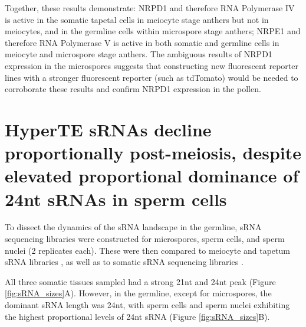Together, these results demonstrate: NRPD1 and therefore RNA Polymerase IV is active in the somatic tapetal cells in meiocyte stage anthers but not in meiocytes, and in the germline cells within microspore stage anthers; NRPE1 and therefore RNA Polymerase V is active in both somatic and germline cells in meiocyte and microspore stage anthers. The ambiguous results of NRPD1 expression in the microspores suggests that constructing new fluorescent reporter lines with a stronger fluorescent reporter (such as tdTomato) would be needed to corroborate these results and confirm NRPD1 expression in the pollen.


\section{HyperTE sRNAs decline proportionally post-meiosis, despite elevated proportional dominance of 24nt sRNAs in sperm cells}

To dissect the dynamics of the sRNA landscape in the germline, sRNA sequencing libraries were constructed for microspores, sperm cells, and sperm nuclei (2 replicates each). These were then compared to meiocyte and tapetum sRNA libraries \citep{RN187}, as well as to somatic sRNA sequencing libraries \citep{RN262,RN263,RN264}. 

All three somatic tissues sampled had a strong 21nt and 24nt peak (Figure \ref{fig:sRNA_sizes}A). However, in the germline, except for microspores, the dominant sRNA length was 24nt, with sperm cells and sperm nuclei exhibiting the highest proportional levels of 24nt sRNA (Figure \ref{fig:sRNA_sizes}B).

